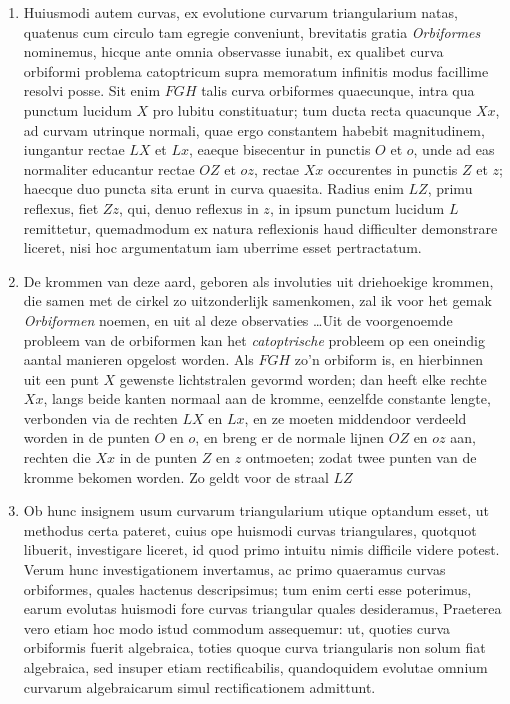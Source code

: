 \documentclass[10pt,a4paper]{article}
\newcommand{\switchenum}{\setcounter{enumi}{\arabic{enumi}-1}\switchcolumn}
\begin{document}
\begin{paracol}{2}
\begin{enumerate}[topsep=1px]
		\switchcolumn*
		
		\item Huiusmodi autem curvas, ex evolutione curvarum triangularium natas, quatenus cum circulo tam egregie conveniunt, brevitatis gratia \textit{Orbiformes} nominemus, hicque ante omnia observasse {\color{BurntOrange}iunabit}, ex qualibet curva orbiformi problema catoptricum supra memoratum infinitis modus facillime resolvi posse. Sit enim $FGH$ talis curva orbiformes quaecunque, intra qua punctum lucidum $X$ pro lubitu constituatur; tum ducta recta quacunque $Xx$, ad curvam utrinque normali, quae ergo constantem habebit magnitudinem, iungantur rectae $LX$ et $Lx$, eaeque bisecentur in punctis $O$ et $o$, unde ad eas normaliter educantur rectae $OZ$ et $oz$, rectae $Xx$ occurentes in punctis $Z$ et $z$; haecque duo puncta sita erunt in curva quaesita. Radius enim $LZ$, primu reflexus, fiet $Zz$, qui, denuo reflexus in $z$, in ipsum punctum lucidum $L$ remittetur, quemadmodum ex natura reflexionis haud difficulter demonstrare liceret, nisi hoc argumentatum iam uberrime esset pertractatum.
		
		\switchenum
		\item De krommen van deze aard, geboren als involuties uit driehoekige krommen, die samen met de cirkel zo uitzonderlijk samenkomen, zal ik voor het gemak \textit{Orbiformen} noemen, en uit al deze observaties \ldots Uit de voorgenoemde probleem van de orbiformen kan het \textit{catoptrische} probleem op een oneindig aantal manieren opgelost worden. Als $FGH$ zo'n orbiform is, en hierbinnen uit een punt $X$ gewenste lichtstralen gevormd worden; dan heeft elke rechte $Xx$, langs beide kanten normaal aan de kromme, eenzelfde constante lengte, verbonden via de rechten $LX$ en $Lx$, en ze moeten middendoor verdeeld worden in de punten $O$ en $o$, en breng er de normale lijnen $OZ$ en $oz$ aan, rechten die $Xx$ in de punten $Z$ en $z$ ontmoeten; zodat twee punten van de kromme bekomen worden. Zo geldt voor de straal $LZ$
		\switchcolumn*

		\item Ob hunc insignem usum curvarum triangularium utique optandum esset, ut methodus certa pateret, cuius ope huismodi curvas triangulares, quotquot libuerit, investigare liceret, id quod primo intuitu nimis difficile videre potest. Verum hunc investigationem invertamus, ac primo quaeramus curvas orbiformes, quales hactenus descripsimus; tum enim certi esse poterimus, earum evolutas huismodi fore curvas triangular quales desideramus, Praeterea vero etiam hoc modo istud commodum assequemur: ut, quoties curva orbiformis fuerit algebraica, toties quoque curva triangularis non solum fiat algebraica, sed insuper etiam rectificabilis, quandoquidem evolutae omnium curvarum algebraicarum simul rectificationem admittunt.
		

\end{enumerate}
\end{paracol}
\end{document}
